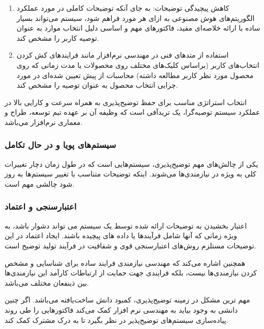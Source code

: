 
\begin{enumerate}
    \item کاهش پیچیدگی توضیحات: به جای آنکه توضیحات کاملی در مورد عملکرد
    الگوریتم‌های هوش مصنوعی به ازای هر مورد فراهم شود، سیستم می‌تواند بسیار ساده
    با ارائه خلاصه‌ای مفید، فاکتور‌های مهم و اساسی دلیل انتخاب موارد به عنوان
    توصیه کاربر را مشخص کند.
    \item استفاده از متد‌های فنی در مهندسی نرم‌افزار مانند فرایند‌های کش کردن
    انتخاب‌های کاربر (براساس کلیک‌های مختلف روی محصولات یا مدت زمانی که روی
    محصول مورد نظر کاربر مطالعه داشته) محاسبات از پیش تعیین شده‌ای در مورد چرایی
    انتخاب محصول به عنوان توصیه را مشخص کند.
\end{enumerate}

انتخاب استراتژی مناسب برای حفظ توضیح‌پذیری به همراه سرعت و کارایی بالا در عملکرد
سیستم توصیه‌گرا، یک تریدآفی است که وظیفه آن بر عهده تیم توسعه، طراح و معماری
نرم‌افزار می‌باشد.

\subsubsection{سیستم‌های پویا و در حال تکامل}

یکی از چالش‌های مهم توضیح‌پذیری، سیستم‌هایی است که در طول زمان دچار تغییرات کلی
به ویژه در نیازمندی‌ها می‌شوند. اینکه توضیحات متناسب با تغییر سیستم‌ها به روز
شود چالشی مهم است.

\subsubsection{اعتبارسنجی و اعتماد}

اعتبار بخشیدن به توضیحات ارائه شده توسط یک سیستم می تواند دشوار باشد، به ویژه
زمانی که آنها شامل فرآیندها یا داده های پیچیده باشند. ایجاد اعتماد در این
توضیحات مستلزم روش‌های اعتبارسنجی قوی و شفافیت در فرآیند تولید توضیح است.

همچنین اشاره می‌کند که مهندسی نیازمندی فرایند ساده برای شناسایی و مشخص کردن
نیازمندی‌ها نیست، بلکه فرایندی جهت حمایت از ارتباطات کارآمد این نیازمندی‌ها بین
ذینفعان مختلف می‌باشد.

مهم ترین مشکل در زمینه توضیح‌پذیری، کمبود دانش ساخت‌یافته می‌باشد. اگر چنین
دانشی به وجود بیاید به مهندسی نرم افزار کمک می‌کند فاکتورهایی را طی روند
پیاده‌سازی سیستم‌های توضیح‌پذیر در نظر بگیرد تا به درک مشترک کمک کند. 

